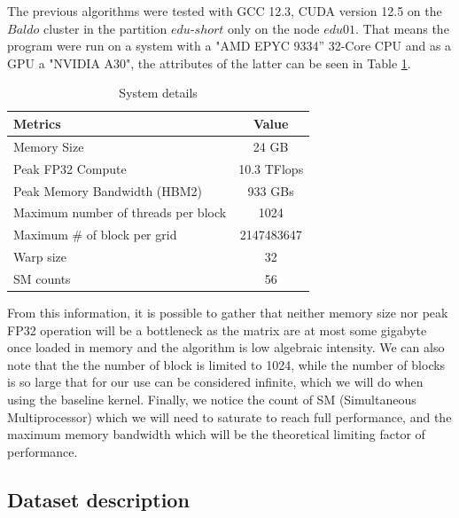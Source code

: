 \documentclass[conference]{IEEEtran}
\begin{document}
The previous algorithms were tested with GCC 12.3, CUDA version 12.5 on the $Baldo$ cluster in the partition $edu$-$short$ only on the node $edu01$. That means the program were run on a system with a "AMD EPYC 9334” 32-Core CPU and as a GPU a "NVIDIA A30", the attributes of the latter can be seen in Table \ref{tab:system_description}.

\begin{table}[h!]
	\centering
	\begin{adjustbox}{width=0.8\columnwidth}
		\begin{tabular}{lc}
			\toprule
			\textbf{Metrics} &  \textbf{Value}  \\
			\midrule
			Memory Size & 24 GB \\
			Peak FP32 Compute &  10.3 TFlops   \\
			Peak Memory Bandwidth (HBM2) & 933 GBs  \\
			Maximum number of threads per block & 1024 \\
			Maximum \# of block per grid & 2147483647 \\
			Warp size & 32 \\
			SM counts & 56 \\
			\bottomrule
		\end{tabular}
	\end{adjustbox}
	\vspace{1em}

	\caption{System details}
	\label{tab:system_description}
\end{table}

From this information, it is possible to gather that neither memory size nor peak FP32 operation will be a bottleneck as the matrix are at most some gigabyte once loaded in memory and the algorithm is low algebraic intensity. We can also note that the the number of block is limited to 1024, while the number of blocks is so large that for our use can be considered infinite, which we will do when using the baseline kernel. Finally, we notice the count of SM (Simultaneous Multiprocessor) which we will need to saturate to reach full performance, and the maximum memory bandwidth which will be the theoretical limiting factor of performance.



\subsection{Dataset description}
\end{document}
